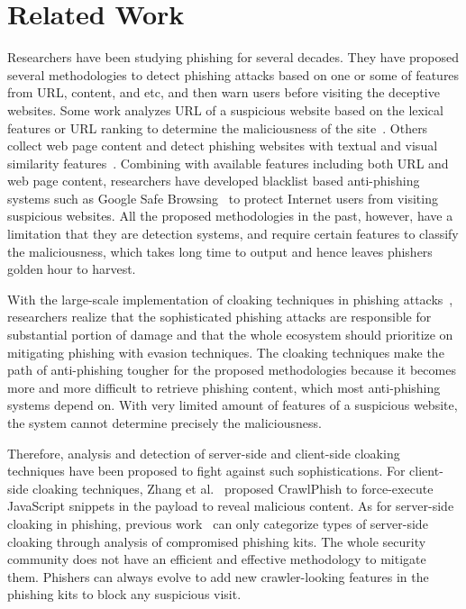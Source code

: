 \section{Related Work}

Researchers have been studying phishing for several decades.
They have proposed several methodologies to detect phishing attacks based on one or some of features from URL, content, and etc, and then warn users before visiting the deceptive websites.
Some work analyzes URL of a suspicious website based on the lexical features or URL ranking to determine the maliciousness of the site~\cite{blum2010lexical, le2011phishdef, khonji2012enhancing, feroz2015phishing}.
Others collect web page content and detect phishing websites with textual and visual similarity features~\cite{zhang2007cantina, zhang2011textual, dunlop2010goldphish}.
Combining with available features including both URL and web page content, researchers have developed blacklist based anti-phishing systems such as Google Safe Browsing~\cite{whittaker2010large} to protect Internet users from visiting suspicious websites.
All the proposed methodologies in the past, however, have a limitation that they are detection systems, and require certain features to classify the maliciousness,
which takes long time to output and hence leaves phishers golden hour to harvest.

With the large-scale implementation of cloaking techniques in phishing attacks~\cite{oest2020sunrise, oest2020phishtime, oest2019phishfarm, oest2018inside}, researchers realize that the sophisticated phishing attacks are responsible for substantial portion of damage and that the whole ecosystem should prioritize on mitigating phishing with evasion techniques.
The cloaking techniques make the path of anti-phishing tougher for the proposed methodologies because it becomes more and more difficult to retrieve phishing content, which most anti-phishing systems depend on.
With very limited amount of features of a suspicious website, the system cannot determine precisely the maliciousness.

Therefore, analysis and detection of server-side
and client-side
% 
cloaking techniques have been proposed to fight against such sophistications.
For client-side cloaking techniques, Zhang et al.~\cite{zhang2021crawlphish} proposed CrawlPhish to force-execute JavaScript snippets in the payload to reveal malicious content.
As for server-side cloaking in phishing, previous work~\cite{wang2011cloak, invernizzi2016cloak, oest2018inside} can only categorize types of server-side cloaking through analysis of compromised phishing kits.
The whole security community does not have an efficient and effective methodology to mitigate them.
Phishers can always evolve to add new crawler-looking features in the phishing kits to block any suspicious visit.



